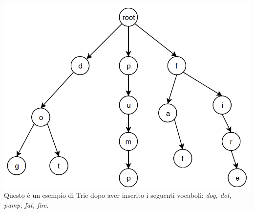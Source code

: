 \documentclass[10pt,a4paper]{article}
\begin{document}
	\begin{center}
		\includegraphics[width=1\textwidth]{trie}
		\small{Questo è un esempio di Trie dopo aver inserito i seguenti vocaboli: \textit{dog, dot, pump, fat, fire}.}
		\newpage
	\end{center}
\end{document}
